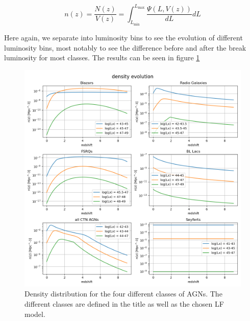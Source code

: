 \begin{equation}
    n(z) =\frac{N(z)}{V(z)} =  \int_{L_{\text{min}}}^{L_{\text{max}}} \frac{\Psi(L, V(z))}{dL} dL
\end{equation}

Here again, we separate into luminosity bins to see the evolution of different luminosity bins, most notably to see the difference before and after the break luminosity for most classes. 
The results can be seen in figure \ref*{fig:DD}









\begin{figure}[H]
    \centering
    \includegraphics[width = \textwidth]{new_plots/Redshift density evolution.png}
    \caption{Density distribution for the four different classes of AGNs. The different classes are defined in the title as well as the chosen LF model.}
    \label{fig:DD}
\end{figure}




